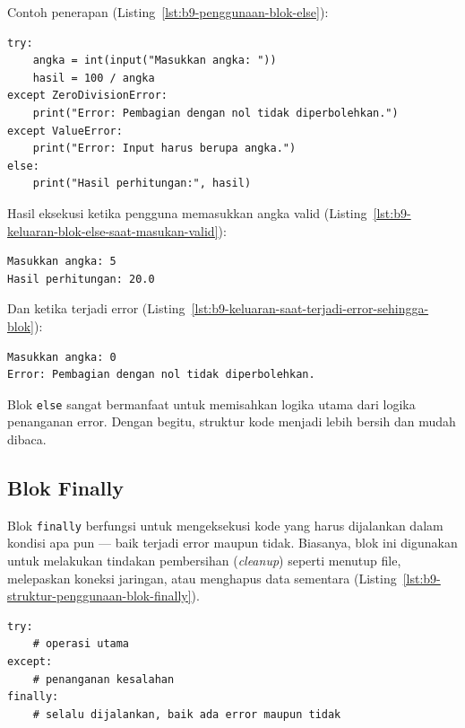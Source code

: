 Contoh penerapan (Listing~\ref{lst:b9-penggunaan-blok-else}):

\begin{lstlisting}[style=PythonStyle, caption={Penggunaan blok else}, label={lst:b9-penggunaan-blok-else}]
try:
    angka = int(input("Masukkan angka: "))
    hasil = 100 / angka
except ZeroDivisionError:
    print("Error: Pembagian dengan nol tidak diperbolehkan.")
except ValueError:
    print("Error: Input harus berupa angka.")
else:
    print("Hasil perhitungan:", hasil)
\end{lstlisting}

Hasil eksekusi ketika pengguna memasukkan angka valid (Listing~\ref{lst:b9-keluaran-blok-else-saat-masukan-valid}):

\begin{lstlisting}[language=bash, caption={Keluaran blok else saat masukan valid}, label={lst:b9-keluaran-blok-else-saat-masukan-valid}]
Masukkan angka: 5
Hasil perhitungan: 20.0
\end{lstlisting}

Dan ketika terjadi error (Listing~\ref{lst:b9-keluaran-saat-terjadi-error-sehingga-blok}):

\begin{lstlisting}[language=bash, caption={Keluaran saat terjadi error sehingga blok else dilewati}, label={lst:b9-keluaran-saat-terjadi-error-sehingga-blok}]
Masukkan angka: 0
Error: Pembagian dengan nol tidak diperbolehkan.
\end{lstlisting}

Blok \texttt{else} sangat bermanfaat untuk memisahkan logika utama dari logika penanganan error. Dengan begitu, struktur kode menjadi lebih bersih dan mudah dibaca.

\subsection*{Blok Finally}

Blok \texttt{finally} berfungsi untuk mengeksekusi kode yang harus dijalankan dalam kondisi apa pun — baik terjadi error maupun tidak. Biasanya, blok ini digunakan untuk melakukan tindakan pembersihan (\textit{cleanup}) seperti menutup file, melepaskan koneksi jaringan, atau menghapus data sementara (Listing~\ref{lst:b9-struktur-penggunaan-blok-finally}).

\begin{lstlisting}[style=PythonStyle, caption={Struktur penggunaan blok finally}, label={lst:b9-struktur-penggunaan-blok-finally}]
try:
    # operasi utama
except:
    # penanganan kesalahan
finally:
    # selalu dijalankan, baik ada error maupun tidak
\end{lstlisting}

